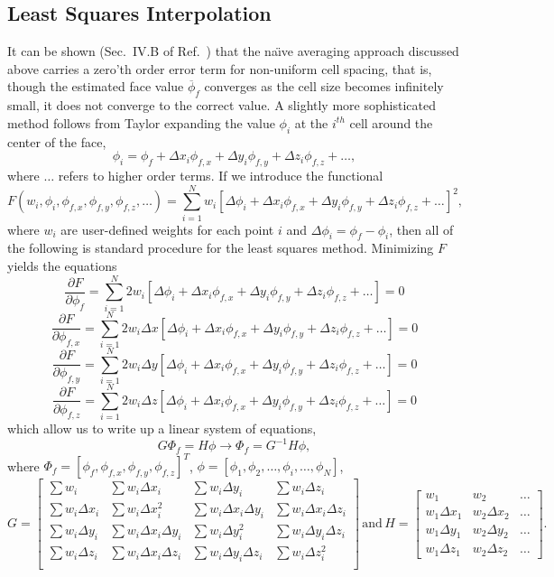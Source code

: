 \documentclass[]{article}
\newcommand{\p}{\partial}
\newcommand{\Eq}[1]{\begin{equation}#1\end{equation}}
\begin{document}
\subsection*{Least Squares Interpolation}
It can be shown (Sec.~IV.B of Ref.~\cite{Sozer2014}) that the na{\"\i}ve averaging approach discussed above carries a zero'th order error term for non-uniform cell spacing, that is, though the estimated face value $\overline{\phi}_f $ converges as the cell size becomes infinitely small, it does not converge to the correct value. A slightly more sophisticated method follows from Taylor expanding the value $\phi_i$ at the $i^{th}$ cell around the center of the face,
\Eq{\phi_i = \phi_f + \Delta x_i\phi_{f,x} + \Delta y_i\phi_{f,y} + \Delta z_i\phi_{f,z} + \dots,}
where $\dots$ refers to higher order terms. If we introduce the functional
\Eq{F(w_i,\phi_i,\phi_{f,x},\phi_{f,y},\phi_{f,z},\dots) = \sum_{i=1}^N w_i\left[\Delta\phi_i + \Delta x_i\phi_{f,x} + \Delta y_i\phi_{f,y} + \Delta z_i\phi_{f,z} + \dots\right]^2,}
where $w_i$ are user-defined weights for each point $i$ and $\Delta\phi_i = \phi_f - \phi_i$, then all of the following is standard procedure for the least squares method. Minimizing $F$ yields the equations
\Eq{\frac{\p F}{\p \phi_f} =  \sum_{i=1}^N 2 w_i\left[\Delta\phi_i + \Delta x_i\phi_{f,x} + \Delta y_i\phi_{f,y} + \Delta z_i\phi_{f,z} + \dots\right] = 0}
\Eq{\frac{\p F}{\p \phi_{f,x}} =  \sum_{i=1}^N 2 w_i\Delta x\left[\Delta\phi_i + \Delta x_i\phi_{f,x} + \Delta y_i\phi_{f,y} + \Delta z_i\phi_{f,z} + \dots\right] = 0}
\Eq{\frac{\p F}{\p \phi_{f,y}} =  \sum_{i=1}^N 2 w_i\Delta y\left[\Delta\phi_i + \Delta x_i\phi_{f,x} + \Delta y_i\phi_{f,y} + \Delta z_i\phi_{f,z} + \dots\right] = 0}
\Eq{\frac{\p F}{\p \phi_{f,z}} =  \sum_{i=1}^N 2 w_i\Delta z\left[\Delta\phi_i + \Delta x_i\phi_{f,x} + \Delta y_i\phi_{f,y} + \Delta z_i\phi_{f,z} + \dots\right] = 0}
which allow us to write up a linear system of equations,
\Eq{G\Phi_f = H\phi \rightarrow \Phi_f = G^{-1}H\phi,\label{eq:FaceLeastSquares}}
where $\Phi_f = [\phi_f,\phi_{f,x},\phi_{f,y},\phi_{f,z}]^T$, $\phi = [\phi_1,\phi_2,\dots,\phi_i,\dots,\phi_N]$,
\Eq{G =
\begin{bmatrix}
    \sum w_i       & \sum w_i \Delta x_i & \sum w_i \Delta y_i & \sum w_i \Delta z_i \\
    \sum w_i \Delta x_i      & \sum w_i \Delta x^2_i & \sum w_i \Delta x_i\Delta y_i & \sum w_i \Delta x_i\Delta z_i \\
    \sum w_i  \Delta y_i     & \sum w_i \Delta x_i\Delta y_i & \sum w_i \Delta y^2_i & \sum w_i \Delta y_i\Delta z_i \\
    \sum w_i  \Delta z_i     & \sum w_i \Delta x_i\Delta z_i & \sum w_i \Delta y_i\Delta z_i & \sum w_i \Delta z^2_i \\
\end{bmatrix}
\, \mathrm{and}\, H = 
\begin{bmatrix}
    w_{1} & w_{2} & \dots  \\
    w_{1}\Delta x_1 & w_{2}\Delta x_2 &  \dots \\
    w_{1}\Delta y_1 & w_{2}\Delta y_2 &  \dots \\
    w_{1}\Delta z_1 & w_{2}\Delta z_2 &  \dots
\end{bmatrix}.}
\end{document}
